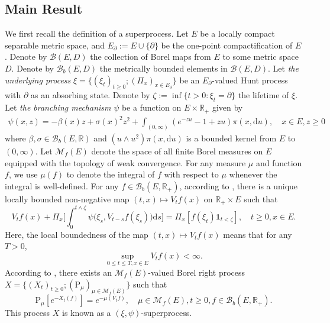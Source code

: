 \documentclass[12pt,a4paper]{amsart}
\numberwithin{equation}{section}
\theoremstyle{plain}
\theoremstyle{definition}
\theoremstyle{remark}
\begin{document}
\subsection{Main Result}\label{sec:M}
	We first recall the definition of a superprocess.
	Let $E$ be a locally compact separable metric space, and $E_\partial := E \cup \{\partial\}$ be the one-point compactification of $E$. 
	Denote by $\mathcal B(E, D)$ the collection of Borel maps  from $E$ to some metric space $D$.
	Denote by $\mathcal B_b(E,D)$ the metrically bounded elements in $\mathcal B(E,D)$.
	Let \emph{the underlying process} 
	$\xi = \{(\xi_t)_{t\ge0}; (\Pi_x)_{x\in E_\partial}\}$
	 be an $E_\partial$-valued Hunt process with $\partial$ as an absorbing state.
	Denote by $\zeta:=\inf\{t>0: \xi_t=\partial\}$ the lifetime of $\xi$.
	Let \emph{the branching mechanism} $\psi$ be a function on $E \times \mathbb R_+$ given by
\begin{align}
	\psi(x,z)
	= -\beta(x) z + \sigma(x)^2 z^2 + \int_{(0,\infty)} (e^{-zu} -1 + zu) \pi(x,{\mathrm d}u),
	\quad x\in E, z\geq 0
\end{align}
	where $\beta, \sigma \in \mathcal B_b(E,\mathbb R)$ and $(u \wedge u^2) \pi(x,{\mathrm d}u)$ is a bounded kernel from $E$ to $(0,\infty)$.
	Let $\mathcal M_f(E)$ denote the space of all finite Borel measures on $E$ equipped with the topology of weak convergence.
		For any measure $\mu$ and function $f$, we use $\mu(f)$ to denote the integral of $f$ with respect to $\mu$ whenever the integral is well-defined.
		For any $f \in \mathcal B_b(E,\mathbb R_+)$, according to \cite[Proposition 2.20]{Li2011Measure-valued}, there is a unique locally bounded non-negative map $(t,x)\mapsto V_tf(x)$ on $\mathbb R_+\times E$ such that
\begin{equation} \label{eq:M.1}
	V_tf(x) + \Pi_x\Big[\int_0^{t\wedge \zeta} \psi\big(\xi_s, V_{t-s} f(\xi_s)\big) {\mathrm d}s\Big] = \Pi_x[f(\xi_t) \mathbf 1_{t< \zeta}], \quad t\geq 0, x\in E.
\end{equation}
	Here, the local boundedness of the map $(t,x) \mapsto V_tf(x)$ means that for any $T>0$,
\[
	\sup_{0\leq t\leq T, x\in E} V_tf(x) < \infty.
\]
	According to \cite[Proposition 2.21 and Theorem 5.12]{Li2011Measure-valued}, there exists 
	an $\mathcal M_f(E)$-valued 
	Borel right process 
		  $X =\{(X_t)_{t\geq 0}; (\mathrm P_\mu)_{\mu \in \mathcal M_f(E)}\}$ such that
	\begin{equation}
	\mathrm P_\mu[e^{- X_t(f)}]
	= e^{- \mu(V_tf)},
	\quad \mu\in \mathcal M_f(E), t\geq 0, f \in \mathcal B_b(E,\mathbb R_+).
\end{equation}
	This process $X$ is known as a $(\xi, \psi)$-superprocess.
	
\end{document}
